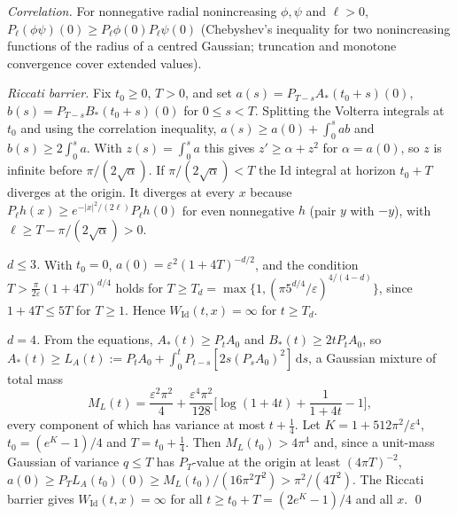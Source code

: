 \documentclass[11pt]{article}
\theoremstyle{definition}
\theoremstyle{remark}
\newcommand{\Id}{\mathrm{Id}}
\newcommand{\dd}{\,\mathrm{d}}
\begin{document}
\emph{Correlation.} For nonnegative radial nonincreasing $\phi,\psi$ and
$\ell>0$, $P_\ell(\phi\psi)(0)\ge P_\ell\phi(0)P_\ell\psi(0)$ (Chebyshev's
inequality for two nonincreasing functions of the radius of a centred
Gaussian; truncation and monotone convergence cover extended values).

\emph{Riccati barrier.} Fix $t_0\ge0$, $T>0$, and set
$a(s)=P_{T-s}A_*(t_0+s)(0)$, $b(s)=P_{T-s}B_*(t_0+s)(0)$ for $0\le s<T$.
Splitting the Volterra integrals at $t_0$ and using the correlation
inequality,
$a(s)\ge a(0)+\int_0^sab$ and $b(s)\ge2\int_0^sa$. With
$z(s)=\int_0^sa$ this gives $z'\ge\alpha+z^2$ for $\alpha=a(0)$, so $z$
is infinite before $\pi/(2\sqrt\alpha)$. If $\pi/(2\sqrt\alpha)<T$ the
$\Id$ integral at horizon $t_0+T$ diverges at the origin. It diverges at
every $x$ because $P_\ell h(x)\ge e^{-|x|^2/(2\ell)}P_\ell h(0)$ for even
nonnegative $h$ (pair $y$ with $-y$), with $\ell\ge T-\pi/(2\sqrt\alpha)>0$.

\emph{$d\le3$.} With $t_0=0$, $a(0)=\varepsilon^2(1+4T)^{-d/2}$, and the
condition $T>\frac{\pi}{2\varepsilon}(1+4T)^{d/4}$ holds for
$T\ge T_d=\max\{1,(\pi5^{d/4}/\varepsilon)^{4/(4-d)}\}$, since
$1+4T\le5T$ for $T\ge1$. Hence $W_\Id(t,x)=\infty$ for $t\ge T_d$.

\emph{$d=4$.} From the equations, $A_*(t)\ge P_tA_0$ and
$B_*(t)\ge2tP_tA_0$, so $A_*(t)\ge L_A(t):=P_tA_0+\int_0^tP_{t-s}
[2s(P_sA_0)^2]\dd s$, a Gaussian mixture of total mass
\[
M_L(t)=\frac{\varepsilon^2\pi^2}{4}+\frac{\varepsilon^4\pi^2}{128}
\Big[\log(1+4t)+\frac1{1+4t}-1\Big],
\]
every component of which has variance at most $t+\frac14$. Let
$K=1+512\pi^2/\varepsilon^4$, $t_0=(e^K-1)/4$ and $T=t_0+\frac14$. Then
$M_L(t_0)>4\pi^4$ and, since a unit-mass Gaussian of variance $q\le T$
has $P_T$-value at the origin at least $(4\pi T)^{-2}$,
$a(0)\ge P_TL_A(t_0)(0)\ge M_L(t_0)/(16\pi^2T^2)>\pi^2/(4T^2)$. The
Riccati barrier gives $W_\Id(t,x)=\infty$ for all
$t\ge t_0+T=(2e^K-1)/4$ and all $x$. \qed



\end{document}
